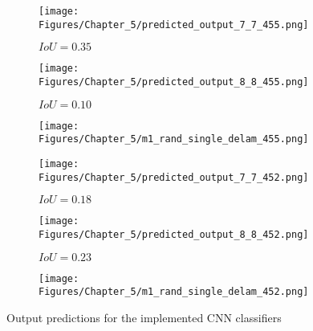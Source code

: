 \begin{figure} [h!]
\begin{subfigure}[b]{0.32\textwidth}
		\centering
		\texttt{[image: Figures/Chapter\_5/predicted\_output\_7\_7\_455.png]}
		\caption{\(IoU=0.35\)}
		\label{fig:pred_7_7_case_455}
	\end{subfigure}
	\hfill
	\begin{subfigure}[b]{0.32\textwidth}
		\centering
		\texttt{[image: Figures/Chapter\_5/predicted\_output\_8\_8\_455.png]}
		\caption{\(IoU=0.10\)}
		\label{fig:pred_8_8_case_455}
	\end{subfigure}
	\hfill
	\begin{subfigure}[b]{0.32\textwidth}
		\centering
		\texttt{[image: Figures/Chapter\_5/m1\_rand\_single\_delam\_455.png]}
		\caption{}
		\label{fig:GT_case_455}
	\end{subfigure}
	\hfill
	\begin{subfigure}[b]{0.32\textwidth}
		\centering
		\texttt{[image: Figures/Chapter\_5/predicted\_output\_7\_7\_452.png]}
		\caption{\(IoU=0.18\)}
		\label{fig:pred_7_7_case_452}
	\end{subfigure}
	\hfill
	\begin{subfigure}[b]{0.32\textwidth}
		\centering
		\texttt{[image: Figures/Chapter\_5/predicted\_output\_8\_8\_452.png]}
		\caption{\(IoU=0.23\)}
		\label{fig:pred_8_8_case_452}
	\end{subfigure}
	\hfill
	\begin{subfigure}[b]{0.32\textwidth}
		\centering
		\texttt{[image: Figures/Chapter\_5/m1\_rand\_single\_delam\_452.png]}
		\caption{}
		\label{fig:GT_case_452}
	\end{subfigure}
	\caption{Output predictions for the implemented CNN classifiers}
	\label{}
\end{figure} 
\clearpage
